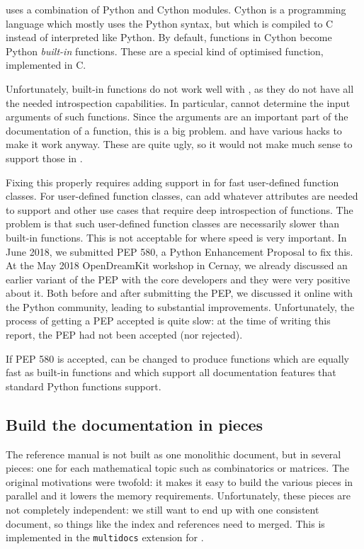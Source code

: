 \documentclass{deliverablereport}
\begin{document}
\Sage uses a combination of Python and Cython modules.
Cython is a programming language which mostly uses the Python syntax,
but which is compiled to C instead of interpreted like Python.
By default, functions in Cython become Python \emph{built-in} functions.
These are a special kind of optimised function, implemented in C.

Unfortunately, built-in functions do not work well with \Sphinx, as they
do not have all the needed introspection capabilities.
In particular, \Sphinx cannot determine the input arguments of such functions.
Since the arguments are an important part of the documentation
of a function, this is a big problem.
\Sage and \Cython have various hacks to make it work anyway.
These are quite ugly, so it would not make much sense to support those in \Sphinx.

Fixing this properly requires adding support in \Python
for fast user-defined function classes.
For user-defined function classes, \Cython can add whatever attributes
are needed to support \Sphinx and other use cases that require deep introspection
of functions.
The problem is that such user-defined function classes
are necessarily slower than built-in functions.
This is not acceptable for \Sage where speed is very important.
In June 2018, we submitted PEP 580, a Python Enhancement Proposal to fix this.
At the May 2018 OpenDreamKit workshop in Cernay,
we already discussed an earlier variant of the PEP
with the core \Cython developers and they were very positive about it.
Both before and after submitting the PEP,
we discussed it online with the Python community,
leading to substantial improvements.
Unfortunately, the process of getting a PEP accepted is quite slow:
at the time of writing this report, the PEP had not been accepted (nor rejected).

If PEP 580 is accepted, \Cython can be changed to produce
functions which are equally fast as built-in functions
and which support all documentation
features that standard Python functions support.

\subsection{Build the documentation in pieces}\label{pieces}

The \Sage reference manual is not built as one monolithic document,
but in several pieces:
one for each mathematical topic such as combinatorics or matrices.
The original motivations were twofold: it makes it easy to build the various pieces
in parallel and it lowers the memory requirements.
Unfortunately, these pieces are not completely independent:
we still want to end up with one consistent document,
so things like the index and references need to merged.
This is implemented in the \Sage \texttt{multidocs} extension for \Sphinx.
\end{document}
